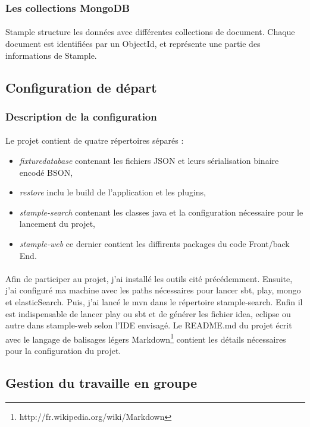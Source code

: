 \subsubsection{Les collections MongoDB}
\paragraph{}
Stample structure les données avec différentes collections de document.
Chaque document est identifiées par un ObjectId, et représente une partie des informations de Stample.
\newpage
\subsection{Configuration de départ}
\subsubsection{Description de la configuration}
\paragraph{}
Le projet contient de quatre répertoires séparés : 
\begin{itemize}
\item \textit{fixturedatabase} contenant les fichiers JSON et leurs sérialisation binaire encodé BSON, 
\item \textit{restore} inclu le build de l'application et les plugins,
\item \textit{stample-search} contenant les classes java et la configuration nécessaire pour le lancement du projet,
\item \textit{stample-web} ce dernier contient les diffirents packages du code Front/back End.
\end{itemize} 
\paragraph{}
Afin de participer au projet, j'ai installé les outils cité précédemment. Ensuite, j'ai configuré ma machine avec les paths nécessaires pour lancer sbt, play, mongo et elasticSearch. Puis, j'ai lancé le mvn dans le répertoire stample-search. Enfin il est indispensable de lancer play ou sbt et de générer les fichier idea, eclipse ou autre dans stample-web selon l'IDE envisagé.    
Le README.md du projet écrit avec le langage de balisages légers Markdown\footnote{http://fr.wikipedia.org/wiki/Markdown} contient les détails nécessaires pour la configuration du projet.
\subsection{Gestion du travaille en groupe}
